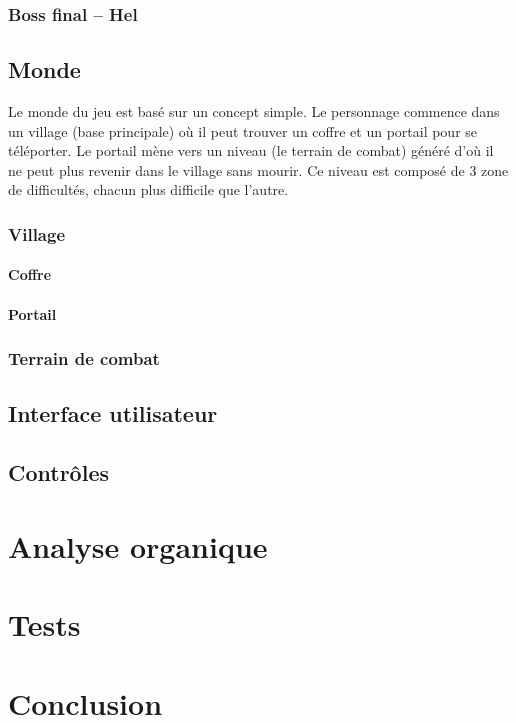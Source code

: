 \documentclass[11pt, a4paper, oneside]{report}
\begin{document}
\subsection{Boss final -- Hel}
\section{Monde}
Le monde du jeu est basé sur un concept simple. Le personnage commence dans un village (base principale) où il peut trouver un coffre et un portail pour se téléporter.
Le portail mène vers un niveau (le terrain de combat) généré d'où il ne peut plus revenir dans le village sans mourir. Ce niveau est composé de 3 zone de difficultés, chacun plus difficile que l'autre.
\subsection{Village}
\subsubsection{Coffre}
\subsubsection{Portail}
\subsection{Terrain de combat}
\section{Interface utilisateur}

\section{Contrôles}
\newpage
\chapter{Analyse organique}

\newpage
\chapter{Tests}

\newpage
\chapter{Conclusion}
\end{document}
